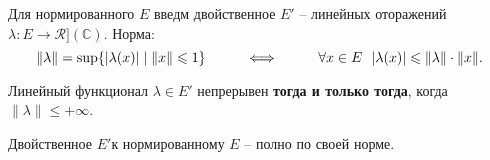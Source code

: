 
\begin{to_def}
	Для нормированного $E$ введм двойственное $E'$ -- линейных оторажений $\lambda \colon E \to \mathcal{R]}(\mathbb{C})$. Норма:
	\begin{equation*}
		\|\lambda\| = \sup \{ |\lambda(x)| \mid \|x\| \leq 1\}
		\hspace{1 cm}
		\Longleftrightarrow
		\hspace{1 cm}
		\forall x \in E \ \  |\lambda(x)| \leq \|\lambda\| \cdot \|x\|.
	\end{equation*}
\end{to_def}

\begin{to_lem}
	Линейный функционал $\lambda \in E'$ непрерывен \textbf{тогда и только тогда}, когда $\|\lambda\| \leq +\infty$. 
\end{to_lem}

\begin{to_thr}
	Двойственное $E'$к нормированному $E$ -- полно по своей норме.
\end{to_thr}